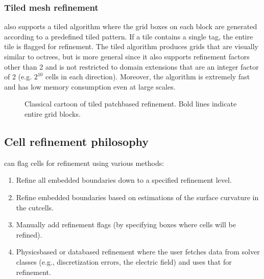 \documentclass[letterpaper,10pt,english]{sphinxmanual}
\let\sphinxpxdimen\pdfpxdimen\else\newdimen\sphinxpxdimen
\begin{document}
\subsubsection{Tiled mesh refinement}
\label{\detokenize{Source/SpatialDiscretization:tiled-mesh-refinement}}
 also supports a tiled algorithm where the grid boxes on each block are generated according to a predefined tiled pattern.
If a tile contains a single tag, the entire tile is flagged for refinement.
The tiled algorithm produces grids that are visually similar to octrees, but is more general since it also supports refinement factors other than 2 and is not restricted to domain extensions that are an integer factor of 2 (e.g. \(2^{10}\) cells in each direction).
Moreover, the algorithm is extremely fast and has low memory consumption even at large scales.

\begin{figure}[htb]
\centering
\capstart

\noindent\sphinxincludegraphics[width=240\sphinxpxdimen]{{TiledMeshRefine}.png}
\caption{Classical cartoon of tiled patch\sphinxhyphen{}based refinement. Bold lines indicate entire grid blocks.}\label{\detokenize{Source/SpatialDiscretization:id7}}\label{\detokenize{Source/SpatialDiscretization:tiledmeshrefine}}\end{figure}


\subsection{Cell refinement philosophy}
\label{\detokenize{Source/SpatialDiscretization:cell-refinement-philosophy}}\label{\detokenize{Source/SpatialDiscretization:chap-refinementphilosophy}}
 can flag cells for refinement using various methods:
\begin{enumerate}
%
\item {} 
Refine all embedded boundaries down to a specified refinement level.

\item {} 
Refine embedded boundaries based on estimations of the surface curvature in the cut\sphinxhyphen{}cells.

\item {} 
Manually add refinement flags (by specifying boxes where cells will be refined).

\item {} 
Physics\sphinxhyphen{}based or data\sphinxhyphen{}based refinement where the user fetches data from solver classes (e.g., discretization errors, the electric field) and uses that for refinement.

\end{enumerate}
\end{document}
